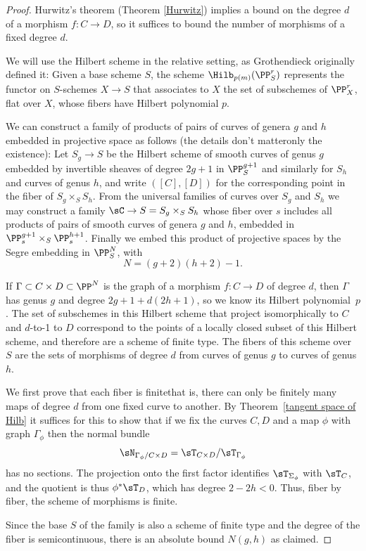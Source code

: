  \begin{proof}
Hurwitz's theorem
%
(Theorem \ref{Hurwitz}) implies a bound on the
degree $d$ of a morphism $f : C \to D$, so it suffices to
 bound the number of morphisms of a fixed degree $d$.

 We will use the Hilbert scheme in the relative setting, as
%
Grothendieck
 originally defined it: Given a base scheme $S$,
the scheme $\Hilb_{p(m)}(\PP_{S}^{r})$ represents the functor on
$S$-schemes $X\to S$ that associates to
$X$ the set of subschemes of $\PP_{X}^{r}$, flat over $X$, whose fibers
have Hilbert polynomial $p$.

We can construct a family of products of pairs of curves of genera $g$
and $h$ embedded in projective space as follows
(the details don't matter\emdash only the existence):
Let $S_{g}\to S$ be the Hilbert scheme of smooth curves of genus $g$
embedded by invertible sheaves of degree $2g+1$
in $\PP^{g+1}_{S}$
and similarly for $S_{h}$ and curves of genus $h$, and write $([C],[D])$
for the corresponding point in the fiber
of $S_{g}\times_{S}S_{h}$. From the universal families of curves over
$S_{g}$ and
$S_{h}$ we may construct a family $\sC \to S= S_{g}\times_{S} S_{h}$
whose fiber over $s$ includes all products of
pairs of smooth curves of genera $g$ and $h$, embedded in
$\PP_{s}^{g+1}\times_{S}\PP_{s}^{h+1}$. Finally we embed
this product of projective spaces by the Segre embedding in $\PP_{S}^{N}$,
%
{\meshing[-3pt]
with $$N = (g+2)(h+2)-1.$$
\unskip}

If $\Gamma \subset C \times D \subset \PP^N$ is the graph of a morphism $f
: C \to D$ of degree $d$, then $\Gamma$ has genus $g$ and degree $2g+1 +
d(2h+1)$, so we know its Hilbert polynomial~$p$. The set of
subschemes in this Hilbert scheme that project isomorphically to $C$
and $d$-to-1 to $D$ correspond to the
points of a  locally closed
subset of
this Hilbert scheme, and therefore
%
are a
scheme of finite type.
%
The fibers
of this scheme over $S$ are the sets of morphisms of degree $d$ from
curves of genus $g$ to curves of genus $h$.

We first prove that each fiber is finite\emdash that is, there can only
be finitely many maps of degree $d$ from
one fixed curve to another.  By Theorem~\ref{tangent space of Hilb} it
suffices for this to show that if we fix the curves $C,D$ and a map $\phi$
with graph $\Gamma_{\phi}$
then the normal bundle
$$
\sN_{\Gamma_{\phi}/C\times D} = \sT_{C\times D}/\sT_{\Gamma_{\phi}}
$$
has no sections. The projection onto the first factor identifies
$\sT_{\Sigma_{\phi}}$ with $\sT_{C}$,
and the quotient is thus $\phi^{*} \sT_{D}$, which has degree
$2-2h<0$. Thus, fiber by fiber,
the scheme of morphisms is finite.

Since the base $S$ of the family is also a scheme of finite type and
%
the degree of the fiber is semicontinuous,
there is an absolute bound $N(g,h)$ as claimed.
 \end{proof}

